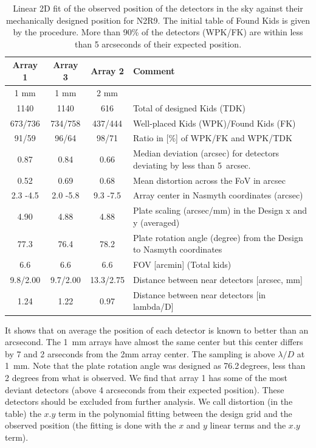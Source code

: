 \begin{table}[ht]
\label{ta:gridmatch}
\begin{center}
\begin{tabular}{|c|c|c|l|}
\hline
Array 1  &	Array 3   &	Array 2   &	Comment \\
\hline
1 mm      &       1 mm     &        2 mm  & \\
1140 	 &      1140 	   &        616  &	Total of designed Kids (TDK) \\
673/736  &	734/758  &	437/444  &	Well-placed Kids (WPK)/Found Kids (FK) \\
91/59 	 &    96/64 	 &      98/71 	 & Ratio in [\%] of WPK/FK and WPK/TDK \\
0.87 	 &     0.84 	  & 0.66     &	Median deviation (arcsec) for detectors deviating by less than 5~arcsec. \\
0.52 	 &     0.69 	 &        0.68 	 & Mean distortion across the FoV in arcsec \\
2.3 -4.5  &	2.0 -5.8  &	9.3 -7.5  &	Array center in Nasmyth coordinates (arcsec) \\
4.90  &	4.88  &	4.88  &	Plate scaling (arcsec/mm) in the Design x and y (averaged) \\
77.3  &	76.4  &	78.2  &	Plate rotation angle (degree) from the Design to Nasmyth coordinates \\
6.6  &	6.6  &	6.6  &	FOV [arcmin] (Total kids) \\
9.8/2.00  &	9.7/2.00  &	13.3/2.75  &	Distance between near detectors [arcsec, mm] \\
1.24  &	1.22  &	0.97  &	Distance between near detectors [in lambda/D] \\
\hline
\end{tabular}
\end{center}
\caption[Field-of-view deformations]{Linear 2D fit of the observed
  position of the detectors in the sky against their mechanically
  designed position for N2R9. The initial table of Found Kids is given
  by the \bms procedure. More than 90\% of the detectors (WPK/FK) are
  within less than 5 arcseconds of their expected position. }
\end{table}

It shows that on average the position of each detector is known to better than
an arcsecond. The 1~mm arrays have almost the same center but this center
differs by 7 and 2 arseconds from the 2mm array center. The sampling is above
$\lambda/D$ at 1~mm. Note that the plate rotation angle was designed as
76.2\,degrees, less than 2 degrees from what is observed. We find that array 1
has some of the most deviant detectors (above 4 arcseconds from their expected
position). These detectors should be excluded from further analysis. We call
distortion (in the table) the $x.y$ term in the polynomial fitting between the
design grid and the observed position (the fitting is done with the $x$ and
$y$ linear terms and the $x.y$ term). 


